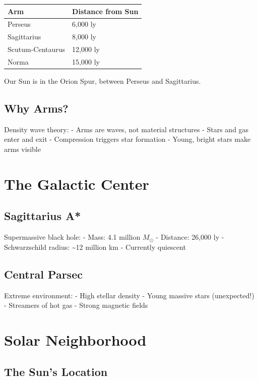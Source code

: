 \documentclass[
  11pt,
  letterpaper,
  twoside,
  openright]{book}
\begin{document}
\begin{longtable}[]{@{}ll@{}}
\toprule\noalign{}
Arm & Distance from Sun \\
\midrule\noalign{}
\endhead
\bottomrule\noalign{}
\endlastfoot
Perseus & 6,000 ly \\
Sagittarius & 8,000 ly \\
Scutum-Centaurus & 12,000 ly \\
Norma & 15,000 ly \\
\end{longtable}

Our Sun is in the Orion Spur, between Perseus and Sagittarius.

\subsection{Why Arms?}\label{why-arms}

Density wave theory: - Arms are waves, not material structures - Stars
and gas enter and exit - Compression triggers star formation - Young,
bright stars make arms visible

\section{The Galactic Center}\label{the-galactic-center}

\subsection{Sagittarius A*}\label{sagittarius-a}

Supermassive black hole: - Mass: 4.1 million \(M_\odot\) - Distance:
26,000 ly - Schwarzschild radius: \textasciitilde12 million km -
Currently quiescent

\subsection{Central Parsec}\label{central-parsec}

Extreme environment: - High stellar density - Young massive stars
(unexpected!) - Streamers of hot gas - Strong magnetic fields

\section{Solar Neighborhood}\label{solar-neighborhood}

\subsection{The Sun's Location}\label{the-suns-location}
\end{document}
